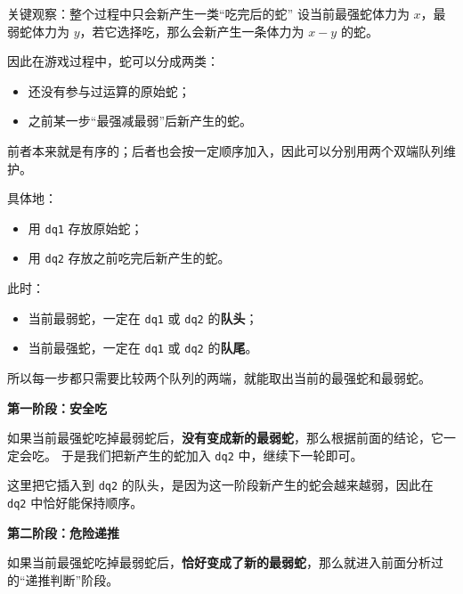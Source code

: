 \documentclass{book}
\newcommand{\code}[1]{\colorbox{codebg}{\texttt{#1}}}  %
\begin{document}
\begin{keybox}{关键观察：整个过程中只会新产生一类“吃完后的蛇”}
设当前最强蛇体力为 $x$，最弱蛇体力为 $y$，若它选择吃，那么会新产生一条体力为 $x-y$ 的蛇。

因此在游戏过程中，蛇可以分成两类：

\begin{itemize}[leftmargin=2em,itemsep=1pt,topsep=2pt,parsep=0pt,partopsep=0pt]
    \item 还没有参与过运算的原始蛇；
    \item 之前某一步“最强减最弱”后新产生的蛇。
\end{itemize}

前者本来就是有序的；后者也会按一定顺序加入，因此可以分别用两个双端队列维护。
\end{keybox}

具体地：

\begin{itemize}[leftmargin=2em,itemsep=1pt,topsep=2pt,parsep=0pt,partopsep=0pt]
    \item 用 \code{dq1} 存放原始蛇；
    \item 用 \code{dq2} 存放之前吃完后新产生的蛇。
\end{itemize}

此时：

\begin{itemize}[leftmargin=2em,itemsep=1pt,topsep=2pt,parsep=0pt,partopsep=0pt]
    \item 当前最弱蛇，一定在 \code{dq1} 或 \code{dq2} 的\textbf{队头}；
    \item 当前最强蛇，一定在 \code{dq1} 或 \code{dq2} 的\textbf{队尾}。
\end{itemize}

所以每一步都只需要比较两个队列的两端，就能取出当前的最强蛇和最弱蛇。

\par\medskip
\noindent\textbf{第一阶段：安全吃}

如果当前最强蛇吃掉最弱蛇后，\textbf{没有变成新的最弱蛇}，那么根据前面的结论，它一定会吃。  
于是我们把新产生的蛇加入 \code{dq2} 中，继续下一轮即可。

这里把它插入到 \code{dq2} 的队头，是因为这一阶段新产生的蛇会越来越弱，因此在 \code{dq2} 中恰好能保持顺序。

\par\medskip
\noindent\textbf{第二阶段：危险递推}

如果当前最强蛇吃掉最弱蛇后，\textbf{恰好变成了新的最弱蛇}，那么就进入前面分析过的“递推判断”阶段。
\end{document}
